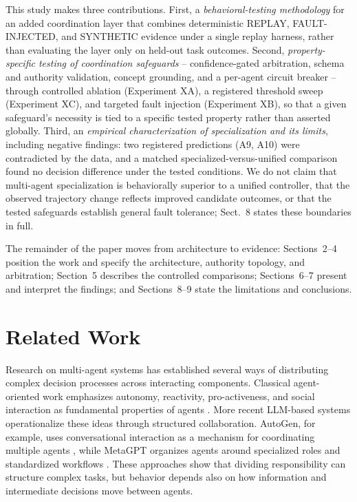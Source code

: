 \documentclass[runningheads]{llncs}
\begin{document}
This study makes three contributions. First, a \emph{behavioral-testing methodology} for an added coordination layer that combines deterministic REPLAY, FAULT-INJECTED, and SYNTHETIC evidence under a single replay harness, rather than evaluating the layer only on held-out task outcomes. Second, \emph{property-specific testing of coordination safeguards} -- confidence-gated arbitration, schema and authority validation, concept grounding, and a per-agent circuit breaker -- through controlled ablation (Experiment XA), a registered threshold sweep (Experiment XC), and targeted fault injection (Experiment XB), so that a given safeguard's necessity is tied to a specific tested property rather than asserted globally. Third, an \emph{empirical characterization of specialization and its limits}, including negative findings: two registered predictions (A9, A10) were contradicted by the data, and a matched specialized-versus-unified comparison found no decision difference under the tested conditions. We do not claim that multi-agent specialization is behaviorally superior to a unified controller, that the observed trajectory change reflects improved candidate outcomes, or that the tested safeguards establish general fault tolerance; Sect.~8 states these boundaries in full.

The remainder of the paper moves from architecture to evidence: Sections~2--4 position the work and specify the architecture, authority topology, and arbitration; Section~5 describes the controlled comparisons; Sections~6--7 present and interpret the findings; and Sections~8--9 state the limitations and conclusions.

\section{Related Work}

Research on multi-agent systems has established several ways of distributing complex decision processes across interacting components. Classical agent-oriented work emphasizes autonomy, reactivity, pro-activeness, and social interaction as fundamental properties of agents \cite{wooldridge1995}. More recent LLM-based systems operationalize these ideas through structured collaboration. AutoGen, for example, uses conversational interaction as a mechanism for coordinating multiple agents \cite{autogen2023}, while MetaGPT organizes agents around specialized roles and standardized workflows \cite{metagpt2024}. These approaches show that dividing responsibility can structure complex tasks, but behavior depends also on how information and intermediate decisions move between agents.
\end{document}
